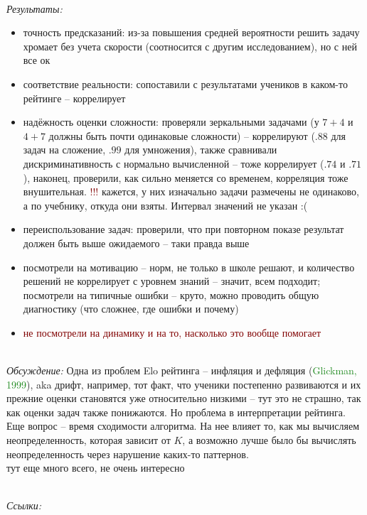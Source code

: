 \documentclass[12pt]{article}
\begin{document}
\bigskip\\\indent\textit{\Large Результаты:}
    \begin{itemize}
        \item точность предсказаний: из-за повышения средней вероятности решить задачу хромает без учета скорости (соотносится с другим исследованием), но с ней все ок
        \item соответствие реальности: сопоставили с результатами учеников в каком-то рейтинге -- коррелирует
        \item надёжность оценки сложности: проверяли зеркальными задачами (у $7 + 4$ и $4 + 7$ должны быть почти одинаковые сложности) -- коррелируют ($.88$ для задач на сложение, $.99$ для умножения), также сравнивали дискриминативность с нормально вычисленной -- тоже коррелирует ($.74$ и $.71$), наконец, проверили, как сильно меняется со временем, корреляция тоже внушительная. \textcolor{Maroon}{!!!} кажется, у них изначально задачи размечены не одинаково, а по учебнику, откуда они взяты. Интервал значений не указан :(
        \item переиспользование задач: проверили, что при повторном показе результат должен быть выше ожидаемого -- таки правда выше
        \item посмотрели на мотивацию -- норм, не только в школе решают, и количество решений не коррелирует с уровнем знаний -- значит, всем подходит; посмотрели на типичные ошибки -- круто, можно проводить общую диагностику (что сложнее, где ошибки и почему)
        \item \textcolor{Maroon}{не посмотрели на динамику и на то, насколько это вообще помогает}
    \end{itemize}
    
\bigskip\\\indent\textit{\Large Обсуждение:}
    Одна из проблем Elo рейтинга -- инфляция и дефляция (\textcolor{ForestGreen}{Glickman, 1999}), aka дрифт, например, тот факт, что ученики постепенно развиваются и их прежние оценки становятся уже относительно низкими -- тут это не страшно, так как оценки задач также понижаются. Но проблема в интерпретации рейтинга. Еще вопрос -- время сходимости алгоритма. На нее влияет то, как мы вычисляем неопределенность, которая зависит от $K$, а возможно лучше было бы вычислять неопределенность через нарушение каких-то паттернов.
    \\\indent тут еще много всего, не очень интересно

\bigskip\\\indent\textit{\Large \color{ForestGreen}Ссылки:}
\end{document}
